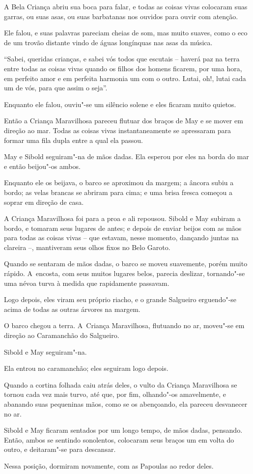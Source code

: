 A Bela Criança abriu sua boca para falar, e todas as coisas vivas
colocaram suas garras, ou suas asas, ou suas barbatanas nos ouvidos para
ouvir com atenção.

Ele falou, e suas palavras pareciam cheias de som, mas muito suaves,
como o eco de um trovão distante vindo de águas longínquas nas asas da
música.

``Sabei, queridas crianças, e sabei vós todos que escutais -- haverá paz
na terra entre todas as coisas vivas quando os filhos dos homens
ficarem, por uma hora, em perfeito amor e em perfeita harmonia um com o
outro. Lutai, oh!, lutai cada um de vós, para que assim o seja''.

Enquanto ele falou, ouviu"-se um silêncio solene e eles ficaram muito
quietos.

Então a Criança Maravilhosa pareceu flutuar dos braços de May e se mover
em direção ao mar. Todas as coisas vivas instantaneamente se apressaram
para formar uma fila dupla entre a qual ela passou.

May e Sibold seguiram"-na de mãos dadas. Ela esperou por eles na borda do
mar e então beijou"-os ambos.

Enquanto ele os beijava, o barco se aproximou da margem; a âncora subiu
a bordo; as velas brancas se abriram para cima; e uma brisa fresca
começou a soprar em direção de casa.

A Criança Maravilhosa foi para a proa e ali repousou. Sibold e May
subiram a bordo, e tomaram seus lugares de antes; e depois de enviar
beijos com as mãos para todas as coisas vivas -- que estavam, nesse
momento, dançando juntas na clareira --, mantiveram seus olhos fixos no
Belo Garoto.

Quando se sentaram de mãos dadas, o barco se moveu suavemente, porém
muito rápido. A~encosta, com seus muitos lugares belos, parecia
deslizar, tornando"-se uma névoa turva à medida que rapidamente passavam.

Logo depois, eles viram seu próprio riacho, e o grande Salgueiro
erguendo"-se acima de todas as outras árvores na margem.

O barco chegou a terra. A~Criança Maravilhosa, flutuando no ar, moveu"-se
em direção ao Caramanchão do Salgueiro.

Sibold e May seguiram"-na.

Ela entrou no caramanchão; eles seguiram logo depois.

Quando a cortina folhada caiu atrás deles, o vulto da Criança
Maravilhosa se tornou cada vez mais turvo, até que, por fim, olhando"-os
amavelmente, e abanando suas pequeninas mãos, como se os abençoando, ela
pareceu desvanecer no ar.

Sibold e May ficaram sentados por um longo tempo, de mãos dadas,
pensando. Então, ambos se sentindo sonolentos, colocaram seus braços um
em volta do outro, e deitaram"-se para descansar.

Nessa posição, dormiram novamente, com as Papoulas ao redor deles.
